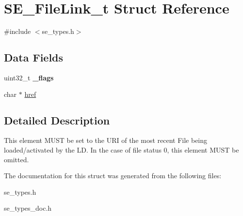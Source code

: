 \hypertarget{structSE__FileLink__t}{}\section{S\+E\+\_\+\+File\+Link\+\_\+t Struct Reference}
\label{structSE__FileLink__t}


{\ttfamily \#include $<$se\+\_\+types.\+h$>$}

\subsection*{Data Fields}
\begin{DoxyCompactItemize}
\item 
uint32\+\_\+t {\bfseries \+\_\+flags}
\item 
char $\ast$ \hyperlink{group__FileLink_ga31ea315596bf5ba69f99332a09616b38}{href}
\end{DoxyCompactItemize}


\subsection{Detailed Description}
This element M\+U\+ST be set to the U\+RI of the most recent File being loaded/activated by the LD. In the case of file status 0, this element M\+U\+ST be omitted. 

The documentation for this struct was generated from the following files\+:\begin{DoxyCompactItemize}
\item 
se\+\_\+types.\+h\item 
se\+\_\+types\+\_\+doc.\+h\end{DoxyCompactItemize}
